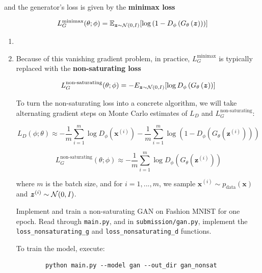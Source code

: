 and the generator’s loss is given by the \textbf{minimax loss}

\begin{equation} \label{eq:7}
    L_{G}^{\text{minimax}}(\theta;\phi) = \mathbb{E}_{\bm{z} \sim \mathcal{N}(0,I)}[\log\left(1 - D_{\phi}\left(G_{\theta}\left(\bm{z}\right)\right)\right)]
\end{equation}

\begin{enumerate}[label=(\alph*)]
    \item 

    \item {} Because of this vanishing gradient problem, in practice, $L_{G}^{\text{minimax}}$ is typically replaced with
    the \textbf{non-saturating loss} 

    \begin{equation} \label{eq:9}
        L_{G}^{\text{non-saturating}}(\theta;\phi) = -E_{\bm{z}\sim\mathcal{N}(0,I)}[\log D_{\phi}\left(G_{\theta}\left(\bm{z}\right)\right)]
    \end{equation}

    To turn the non-saturating loss into a concrete algorithm, we will take alternating gradient steps on Monte Carlo 
    estimates of $L_D$ and $L_{G}^{\text{non-saturating}}$:

    \begin{equation} \label{eq:10}
        L_D(\phi; \theta) \approx - \frac{1}{m} \sum\limits_{i=1}^{m} \log D_{\phi}\left(\bm{x}^{(i)}\right) - \frac{1}{m}\sum\limits_{i=1}^{m} \log\left(1-D_{\phi}\left(G_{\theta}\left(\bm{z}^{(i)}\right)\right)\right)
    \end{equation}

    \begin{equation} \label{eq:11}
        L_{G}^{\text{non-saturating}}(\theta;\phi) \approx - \frac{1}{m} \sum\limits_{i=1}^{m} \log D_{\phi}\left(G_{\theta}\left(\bm{z}^{(i)}\right)\right)
    \end{equation}

    where $m$ is the batch size, and for $i = 1,...,m$, we sample $\bm{x}^{(i)} \sim p_{\text{data}}(\bm{x})$ and $\bm{z}^{(i)} \sim \mathcal{N}(0,I)$.

    Implement and train a non-saturating GAN on Fashion MNIST for one epoch. Read through \texttt{main.py}, 
    and in \texttt{submission/gan.py}, implement the \texttt{loss\_nonsaturating\_g} and \texttt{loss\_nonsaturating\_d} functions. 

    To train the model, execute:
    \begin{verbatim}
        python main.py --model gan --out_dir gan_nonsat
    \end{verbatim}  


\end{enumerate}
